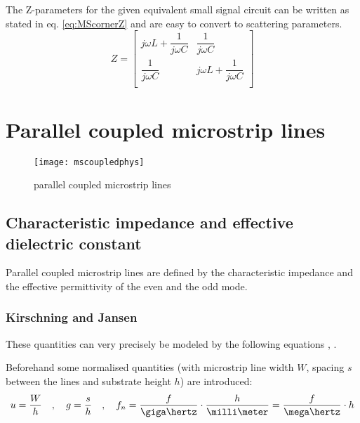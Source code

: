 The Z-parameters for the given equivalent small signal circuit can be
written as stated in eq. \eqref{eq:MScornerZ} and are easy to convert
to scattering parameters.
\begin{equation}
Z =
\begin{bmatrix}
j\omega L + \dfrac{1}{j\omega C} & \dfrac{1}{j\omega C}\\
\dfrac{1}{j\omega C} & j\omega L + \dfrac{1}{j\omega C}\\
\end{bmatrix}
\label{eq:MScornerZ}
\end{equation}

\section{Parallel coupled microstrip lines}

\begin{figure}[ht]
\begin{center}
\texttt{[image: mscoupledphys]}
\end{center}
\caption{parallel coupled microstrip lines}
\label{fig:McoupledPhys}
\end{figure}
\FloatBarrier

\subsection{Characteristic impedance and effective dielectric constant}

Parallel coupled microstrip lines are defined by the characteristic
impedance and the effective permittivity of the even and the odd mode.

\subsubsection{Kirschning and Jansen}

These quantities can very precisely be modeled by the following
equations \cite{Kirschning2}, \cite{Kirschning6}.

\addvspace{12pt}

Beforehand some normalised quantities (with microstrip line width $W$,
spacing $s$ between the lines and substrate height $h$) are
introduced:
\begin{equation}
u = \dfrac{W}{h} \quad,\quad g = \dfrac{s}{h} \quad,\quad
f_n = \dfrac{f}{\giga\hertz}\cdot\dfrac{h}{\milli\meter} = \dfrac{f}{\mega\hertz}\cdot h
\end{equation}

